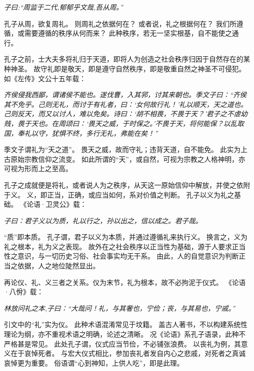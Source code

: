 \documentclass[11pt]{article}
\begin{document}
\textit{子曰:“周监于二代,郁郁乎文哉,吾从周。”}

孔子从周，欲复周礼。
则周礼之依据何在？
或者说，礼之根据何在？
我们所遵循，或需要遵循的秩序从何而来？
此种秩序，若无一坚实根基，自不能使之通行。

\newline

孔子之前，士大夫多将礼归于天道，即将人为创造之社会秩序归因于自然存在的某种神圣。
故守礼即是敬天，即是遵守自然秩序，即是敬重自然之神圣不可侵犯。
如《左传》文公十五年载：

\textit{齐侯侵我西鄙，谓诸侯不能也。遂伐曹，入其郛，讨其来朝也。季文子曰：“齐侯其不免乎。己则无礼，而讨于有礼者，曰：‘女何故行礼！’礼以顺天，天之道也。己则反天，而又以讨人，难以免矣。诗曰：‘胡不相畏，不畏于天？’君子之不虐幼贱，畏于天也。在周颂曰：‘畏天之威，于时保之。’不畏于天，将何能保？以乱取国，奉礼以守，犹惧不终，多行无礼，弗能在矣！”}

季文子谓礼为“天之道”。
畏天之威，故而守礼；违背天道，自不能免。
此实为上古原始宗教信仰之流变。
如此所谓的“天”，或自然，可视为宗教之人格神明，亦可视为形而上之至高。

\newline

孔子之成就便是将礼，或者说人为之秩序，从天这一原始信仰中解放，并使之依附于义。
义，即正当，正确，或应当如何，系对价值之判断。
孔子以义为礼之基础。
《论语·卫灵公》载：

\textit{子曰：君子义以为质，礼以行之，孙以出之，信以成之。君子哉。}

“质”即本质。
孔子谓，君子以义为本质，并通过遵循礼来执行义。
换言之，义为礼之根本，礼为义之表现。
故外在之社会秩序以正当性为基础，源于人要求正当性之意识，与一切历史习俗、社会事实均无干系。
由此，人的自觉意识为判断正当之依据，人之地位陡然显出。

\newline

再论仪、礼、义三者之关系。仪为末节，礼为根本，故不必拘泥于仪式。
《论语·八佾》载：

\textit{林放问礼之本,子曰：“大哉问！礼，与其奢也，宁俭；丧，与其易也，宁戚。”}

引文中的“礼”实为仪。
此种术语混淆常见于坟籍。
盖古人著书，不以构建系统性理论为纲，亦不重视术语之明确，论述之清晰。
况《论语》系孔子语录，此种不严格甚是常见。
此处孔子谓，仪式应当节俭，不必铺张浪费。
以丧礼为例，其意义在于哀悼死者。
与宏大仪式相比，参加丧礼者发自内心之悲戚，对死者之真诚哀悼更为重要。
俗语谓“心到神知，上供人吃”，即是此理。

\newline
\end{document}
